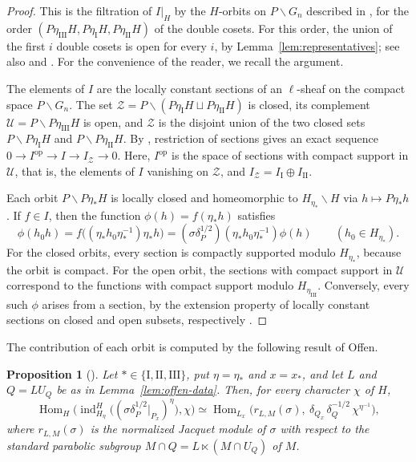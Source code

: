 \documentclass[11pt]{amsart}
\numberwithin{equation}{section}
\theoremstyle{plain}
\newtheorem{proposition}[theorem]{Proposition}
\theoremstyle{definition}
\theoremstyle{remark}
\DeclareMathOperator{\Hom}{Hom}
\DeclareMathOperator{\ind}{ind}
\begin{document}
\begin{proof}
	This is the filtration of $I|_H$ by the $H$-orbits on $P\backslash G_n$ described in \cite[\S4, (4)]{Off17}, for the order $(P\eta_{\mathrm{III}}H,P\eta_{\mathrm{I}}H,P\eta_{\mathrm{II}}H)$ of the double cosets. For this order, the union of the first $i$ double cosets is open for every $i$, by Lemma~\ref{lem:representatives}; see also \cite[\S\S1.8, 2.23]{BZ76} and \cite[\S5]{BZ77}. For the convenience of the reader, we recall the argument.
	
	The elements of $I$ are the locally constant sections of an $\ell$-sheaf on the compact space $P\backslash G_n$. The set $\mathcal Z=P\backslash(P\eta_{\mathrm I}H\sqcup P\eta_{\mathrm{II}}H)$ is closed, its complement $\mathcal U=P\backslash P\eta_{\mathrm{III}}H$ is open, and $\mathcal Z$ is the disjoint union of the two closed sets $P\backslash P\eta_{\mathrm I}H$ and $P\backslash P\eta_{\mathrm{II}}H$. By \cite[Proposition 1.8]{BZ76}, restriction of sections gives an exact sequence $0\to I^{\mathrm{op}}\to I\to I_{\mathcal Z}\to0$. Here, $I^{\mathrm{op}}$ is the space of sections with compact support in $\mathcal U$, that is, the elements of $I$ vanishing on $\mathcal Z$, and $I_{\mathcal Z}=I_{\mathrm I}\oplus I_{\mathrm{II}}$.
	
	Each orbit $P\backslash P\eta_*H$ is locally closed and homeomorphic to $H_{\eta_*}\backslash H$ via $h\mapsto P\eta_*h$ \cite[\S1.5]{BZ76}. If $f\in I$, then the function $\phi(h)=f(\eta_*h)$ satisfies
	$$
	\phi(h_0h)=f\big((\eta_*h_0\eta_*^{-1})\eta_*h\big)=(\sigma\delta_P^{1/2})(\eta_*h_0\eta_*^{-1})\phi(h)\qquad(h_0\in H_{\eta_*}).
	$$
	For the closed orbits, every section is compactly supported modulo $H_{\eta_*}$, because the orbit is compact. For the open orbit, the sections with compact support in $\mathcal U$ correspond to the functions with compact support modulo $H_{\eta_{\mathrm{III}}}$. Conversely, every such $\phi$ arises from a section, by the extension property of locally constant sections on closed and open subsets, respectively \cite[\S1]{BZ76}.
\end{proof}

The contribution of each orbit is computed by the following result of Offen.

\begin{proposition}[{\cite[Proposition 4.1]{Off17}}]\label{prop:offen41}
	Let $*\in\{\mathrm I,\mathrm{II},\mathrm{III}\}$, put $\eta=\eta_*$ and $x=x_*$, and let $L$ and $Q=LU_Q$ be as in Lemma~\ref{lem:offen-data}. Then, for every character $\chi$ of $H$,
	$$
	\Hom_H\Big(\ind_{H_\eta}^H\big((\sigma\delta_P^{1/2}|_{P_x})^\eta\big),\chi\Big)\simeq\Hom_{L_x}\big(r_{L,M}(\sigma),\ \delta_{Q_x}\,\delta_Q^{-1/2}\,\chi^{\eta^{-1}}\big),
	$$
	where $r_{L,M}(\sigma)$ is the normalized Jacquet module of $\sigma$ with respect to the standard parabolic subgroup $M\cap Q=L\ltimes(M\cap U_Q)$ of $M$.
\end{proposition}
\end{document}
